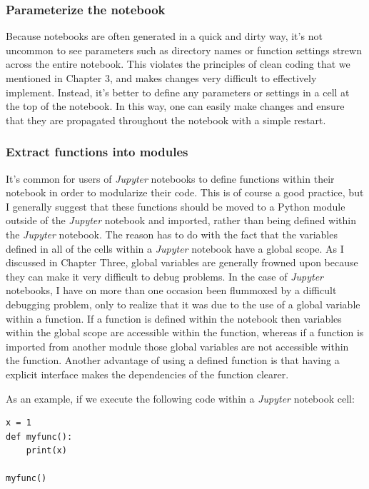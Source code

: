 \subsubsection{Parameterize the notebook}

Because notebooks are often generated in a quick and dirty way, it's not uncommon to see parameters such as directory names or function settings strewn across the entire notebook.  This violates the principles of clean coding that we mentioned in Chapter 3, and makes changes very difficult to effectively implement. Instead, it's better to define any parameters or settings in a cell at the top of the notebook. In this way, one can easily make changes and ensure that they are propagated throughout the notebook with a simple restart.

\subsubsection{Extract functions into modules}

It's common for users of \textit{Jupyter} notebooks to define functions within their notebook in order to modularize their code. This is of course a good practice, but I generally suggest that these functions should be moved to a Python module outside of the \textit{Jupyter} notebook and imported, rather than being defined within the \textit{Jupyter} notebook. The reason has to do with the fact that the variables defined in all of the cells within a \textit{Jupyter} notebook have a global scope.  As I discussed in Chapter Three, global variables are generally frowned upon because they can make it very difficult to debug problems.  In the case of \textit{Jupyter} notebooks, I have on more than one occasion been flummoxed by a difficult debugging problem, only to realize that it was due to the use of a global variable within a function.  If a function is defined within the notebook then variables within the global scope are accessible within the function, whereas if a function is imported from another module those global variables are not accessible within the function. Another advantage of using a defined function is that having a explicit interface makes the dependencies of the function clearer.

As an example, if we execute the following code within a \textit{Jupyter} notebook cell:

\begin{lstlisting}[style=Python]
x = 1
def myfunc():
    print(x)

myfunc()
\end{lstlisting}

